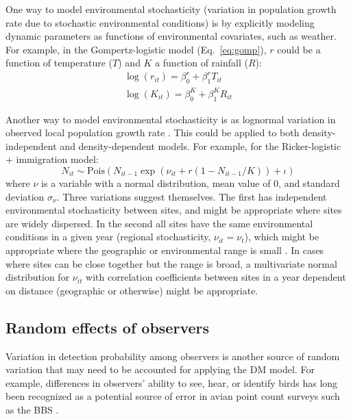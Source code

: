 \documentclass[12pt]{article}
\begin{document}
One way to model environmental stochasticity (variation in population growth
rate due to stochastic environmental conditions) is by explicitly
modeling dynamic parameters as functions of environmental covariates, such
as weather.  For example, in the Gompertz-logistic model (Eq.~\ref{eq:gomp}), $r$ could be a 
function of temperature ($T$) and $K$ a function of rainfall ($R$):
\begin{gather}
\log(r_{it}) = \beta^{r}_{0} + \beta^{r}_{1}T_{it} \nonumber \\
\log(K_{it}) = \beta^{K}_{0} + \beta^{K}_{1}R_{it}  
\label{eq:weather}
\end{gather}

Another way to model environmental stochasticity is as lognormal variation in observed local population 
growth rate \citep{bjornstad:2001,bonsall_hastings:2004}.  This could be applied to both density-independent and density-dependent models.
For example, for the Ricker-logistic + immigration model:
\begin{equation}
N_{it} \sim
\text{Pois}(N_{it-1}\exp(\nu_{it} + r(1-N_{it-1}/K)) + \iota)
\label{eq:nuRand}
\end{equation}
where $\nu$ is a variable with a normal distribution, mean value of 0, and standard deviation $\sigma_\nu$.  
Three variations suggest themselves.  The first has independent environmental stochasticity 
between sites, and might be appropriate where sites are widely dispersed.  In the second 
all sites have the same environmental conditions in a given year (regional stochasticity, $\nu_{it} = \nu_{t}$),
which might be appropriate where the geographic or environmental range is small \citep{hanski:1998}.  
In cases where sites can be close together but the range is broad, a multivariate normal distribution for $\nu_{it}$ with correlation coefficients
between sites in a year dependent on distance (geographic or otherwise) might be appropriate.

\subsection{Random effects of observers}

Variation in detection probability among observers is another
source of random variation that may need to be accounted for applying
the DM model. For example, differences in observers' ability to see,
hear, or identify birds has long been recognized as a potential source of error
in avian point count surveys such as the BBS 
\citep{robbins_etal:1986,sauer_etal:1994auk,diefenbach_etal:2003,campbell_francis:2011}.%
\end{document}
